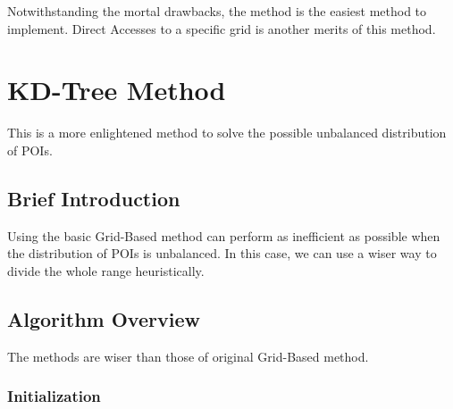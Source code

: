 \documentclass{acm_proc_article-sp}
\begin{document}
Notwithstanding the mortal drawbacks, the method is the easiest method to implement. Direct Accesses to a specific grid is another merits of this method.

\section{KD-Tree Method}

This is a more enlightened method to solve the possible unbalanced distribution of POIs. 

\subsection{Brief Introduction}

Using the basic Grid-Based method can perform as inefficient as possible when the distribution of POIs is unbalanced. In this case, we can use a wiser way to divide the whole range heuristically. 

\subsection{Algorithm Overview}

The methods are wiser than those of original Grid-Based method.

\subsubsection{Initialization}
\end{document}
